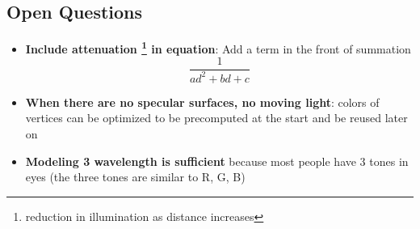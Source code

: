   \subsection{Open Questions}

    \begin{itemize}
      \item \textbf{Include attenuation
      \footnote{reduction in illumination as distance increases} in equation}:
      Add a term in the front of summation
      \begin{equation*}
        \frac{1}{ad^{2} + bd + c}
      \end{equation*}

      \item \textbf{When there are no specular surfaces, no moving light}:
      colors of vertices can be optimized to be precomputed at the start and
      be reused later on

      \item \textbf{Modeling 3 wavelength is sufficient} because most people
      have 3 tones in eyes (the three tones are similar to R, G, B)
    \end{itemize}
